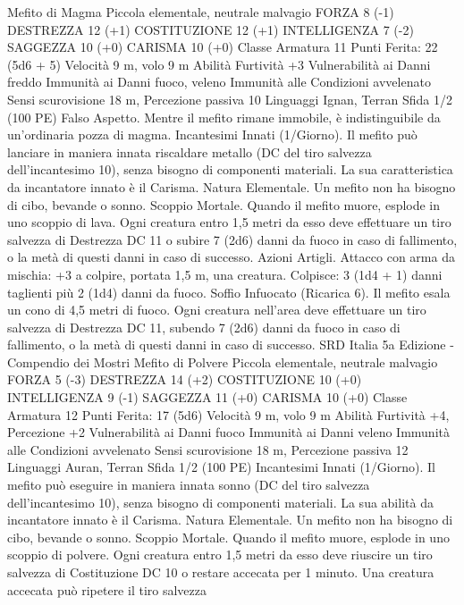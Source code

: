 \begin{multicols}{2}
Mefito di Magma
Piccola elementale, neutrale malvagio
FORZA 8 (-1)
DESTREZZA 12 (+1)
COSTITUZIONE 12 (+1)
INTELLIGENZA 7 (-2)
SAGGEZZA 10 (+0)
CARISMA 10 (+0)
Classe Armatura 11
\hspace*{0pt}\hfill{Punti Ferita}: 22 (5d6 + 5)
Velocità 9 m, volo 9 m
Abilità Furtività +3
Vulnerabilità ai Danni freddo
Immunità ai Danni fuoco, veleno
Immunità alle Condizioni avvelenato
Sensi scurovisione 18 m, Percezione passiva 10
Linguaggi Ignan, Terran
Sfida 1/2 (100 PE)
Falso Aspetto. Mentre il mefito rimane immobile, è
indistinguibile da un’ordinaria pozza di magma.
Incantesimi Innati (1/Giorno). Il mefito può lanciare in maniera
innata riscaldare metallo (DC del tiro salvezza dell’incantesimo
10), senza bisogno di componenti materiali. La sua caratteristica
da incantatore innato è il Carisma.
Natura Elementale. Un mefito non ha bisogno di cibo, bevande
o sonno.
Scoppio Mortale. Quando il mefito muore, esplode in uno
scoppio di lava. Ogni creatura entro 1,5 metri da esso deve
effettuare un tiro salvezza di Destrezza DC 11 o subire 7 (2d6)
danni da fuoco in caso di fallimento, o la metà di questi danni in
caso di successo.
Azioni
Artigli. Attacco con arma da mischia: +3 a colpire, portata 1,5
m, una creatura.
Colpisce: 3 (1d4 + 1) danni taglienti più 2 (1d4) danni da fuoco.
Soffio Infuocato (Ricarica 6). Il mefito esala un cono di 4,5
metri di fuoco. Ogni creatura nell’area deve effettuare un tiro
salvezza di Destrezza DC 11, subendo 7 (2d6) danni da fuoco in
caso di fallimento, o la metà di questi danni in caso di successo.
SRD Italia 5a Edizione - Compendio dei Mostri
Mefito di Polvere
Piccola elementale, neutrale malvagio
FORZA 5 (-3)
DESTREZZA 14 (+2)
COSTITUZIONE 10 (+0)
INTELLIGENZA 9 (-1)
SAGGEZZA 11 (+0)
CARISMA 10 (+0)
Classe Armatura 12
\hspace*{0pt}\hfill{Punti Ferita}: 17 (5d6)
Velocità 9 m, volo 9 m
Abilità Furtività +4, Percezione +2
Vulnerabilità ai Danni fuoco
Immunità ai Danni veleno
Immunità alle Condizioni avvelenato
Sensi scurovisione 18 m, Percezione passiva 12
Linguaggi Auran, Terran
Sfida 1/2 (100 PE)
Incantesimi Innati (1/Giorno). Il mefito può eseguire in maniera
innata sonno (DC del tiro salvezza dell’incantesimo 10), senza
bisogno di componenti materiali. La sua abilità da incantatore
innato è il Carisma.
Natura Elementale. Un mefito non ha bisogno di cibo, bevande
o sonno.
Scoppio Mortale. Quando il mefito muore, esplode in uno
scoppio di polvere. Ogni creatura entro 1,5 metri da esso deve
riuscire un tiro salvezza di Costituzione DC 10 o restare accecata
per 1 minuto. Una creatura accecata può ripetere il tiro salvezza

\end{multicols}
